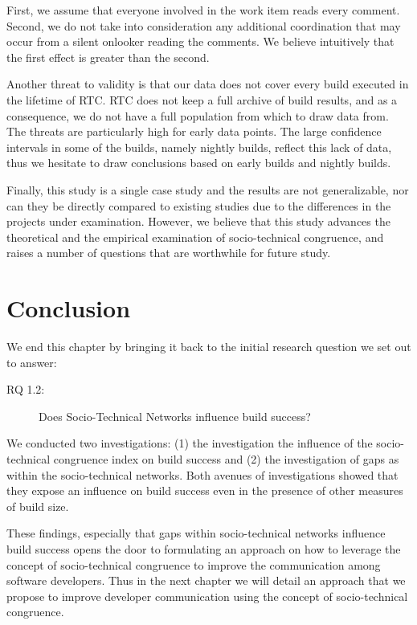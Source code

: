 First, we assume that everyone involved in the work item reads every comment. Second, we do not take into consideration any additional coordination that may occur from a silent onlooker reading the comments. We believe intuitively that the first effect is greater than the second.

Another threat to validity is that our data does not cover every build executed in the lifetime of RTC. RTC does not keep a full archive of build results, and as a consequence, we do not have a full population from which to draw data from. The threats are particularly high for early data points. The large confidence intervals in some of the builds, namely nightly builds, reflect this lack of data, thus we hesitate to draw conclusions based on early builds and nightly builds.

Finally, this study is a single case study and the results are not generalizable, nor can they be directly compared to existing studies due to the differences in the projects under examination. However, we believe that this study advances the theoretical and the empirical examination of socio-technical congruence, and raises a number of questions that are worthwhile for future study.


\section{Conclusion}
\label{sec:conclusion}
We end this chapter by bringing it back to the initial research question we set out to answer:
\begin{description}
  \item[RQ 1.2:] Does Socio-Technical Networks influence build success?
\end{description}

We conducted two investigations: (1) the investigation the influence of the socio-technical congruence index on build success and (2) the investigation of gaps as within the socio-technical networks.
Both avenues of investigations showed that they expose an influence on build success even in the presence of other measures of build size.

These findings, especially that gaps within socio-technical networks influence build success opens the door to formulating an approach on how to leverage the concept of socio-technical congruence to improve the communication among software developers.
Thus in the next chapter we will detail an approach that we propose to improve developer communication using the concept of socio-technical congruence.
